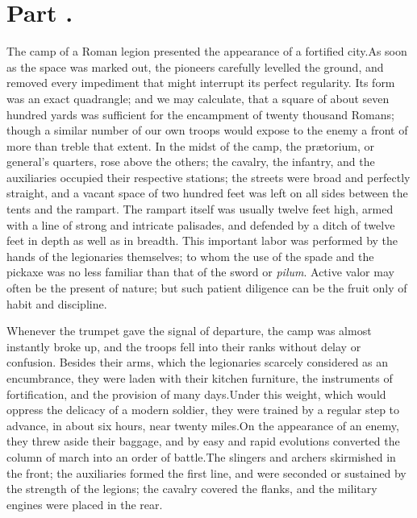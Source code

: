 \section{Part \thesection.}
\thispagestyle{simple}

The camp of a Roman legion presented the appearance of a
fortified city.\footnotemark[60] As soon as the space was marked out, the
pioneers carefully levelled the ground, and removed every
impediment that might interrupt its perfect regularity. Its form
was an exact quadrangle; and we may calculate, that a square of
about seven hundred yards was sufficient for the encampment of
twenty thousand Romans; though a similar number of our own troops
would expose to the enemy a front of more than treble that
extent. In the midst of the camp, the prætorium, or general’s
quarters, rose above the others; the cavalry, the infantry, and
the auxiliaries occupied their respective stations; the streets
were broad and perfectly straight, and a vacant space of two
hundred feet was left on all sides between the tents and the
rampart. The rampart itself was usually twelve feet high, armed
with a line of strong and intricate palisades, and defended by a
ditch of twelve feet in depth as well as in breadth. This
important labor was performed by the hands of the legionaries
themselves; to whom the use of the spade and the pickaxe was no
less familiar than that of the sword or \textit{pilum}. Active valor may
often be the present of nature; but such patient diligence can be
the fruit only of habit and discipline.\footnotemark[61]



Whenever the trumpet gave the signal of departure, the camp was
almost instantly broke up, and the troops fell into their ranks
without delay or confusion. Besides their arms, which the
legionaries scarcely considered as an encumbrance, they were
laden with their kitchen furniture, the instruments of
fortification, and the provision of many days.\footnotemark[62] Under this
weight, which would oppress the delicacy of a modern soldier,
they were trained by a regular step to advance, in about six
hours, near twenty miles.\footnotemark[63] On the appearance of an enemy, they
threw aside their baggage, and by easy and rapid evolutions
converted the column of march into an order of battle.\footnotemark[64] The
slingers and archers skirmished in the front; the auxiliaries
formed the first line, and were seconded or sustained by the
strength of the legions; the cavalry covered the flanks, and the
military engines were placed in the rear.

